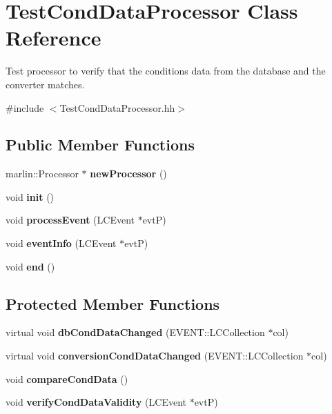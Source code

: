 \section{TestCondDataProcessor Class Reference}
\label{classTestCondDataProcessor}


Test processor to verify that the conditions data from the database and the converter matches.  


{\ttfamily \#include $<$TestCondDataProcessor.hh$>$}\subsection*{Public Member Functions}
\begin{DoxyCompactItemize}
\item 
marlin::Processor $\ast$ {\bfseries newProcessor} ()\label{classTestCondDataProcessor_a41bcc6ef81e323c404329239e3c91b33}

\item 
void {\bfseries init} ()\label{classTestCondDataProcessor_af8f6a10ec8f52851c570e0befe6a2cd6}

\item 
void {\bfseries processEvent} (LCEvent $\ast$evtP)\label{classTestCondDataProcessor_a64b807904fd307bce9c2ebd4a826a7a9}

\item 
void {\bfseries eventInfo} (LCEvent $\ast$evtP)\label{classTestCondDataProcessor_a4b1593ba8eae5216c73375d958fc6ac0}

\item 
void {\bfseries end} ()\label{classTestCondDataProcessor_adf755fd78a25fa7582d147dd6b12a6ab}

\end{DoxyCompactItemize}
\subsection*{Protected Member Functions}
\begin{DoxyCompactItemize}
\item 
virtual void {\bfseries dbCondDataChanged} (EVENT::LCCollection $\ast$col)\label{classTestCondDataProcessor_a11d117de5b81da6e3246171f56d78d08}

\item 
virtual void {\bfseries conversionCondDataChanged} (EVENT::LCCollection $\ast$col)\label{classTestCondDataProcessor_a2fc2e10fcae642399e67708808dba688}

\item 
void {\bfseries compareCondData} ()\label{classTestCondDataProcessor_a0b664c9a1fed4642636cba44a3d98947}

\item 
void {\bfseries verifyCondDataValidity} (LCEvent $\ast$evtP)\label{classTestCondDataProcessor_ae0539d5334c95c21a9e6a8df40db6993}

\end{DoxyCompactItemize}
